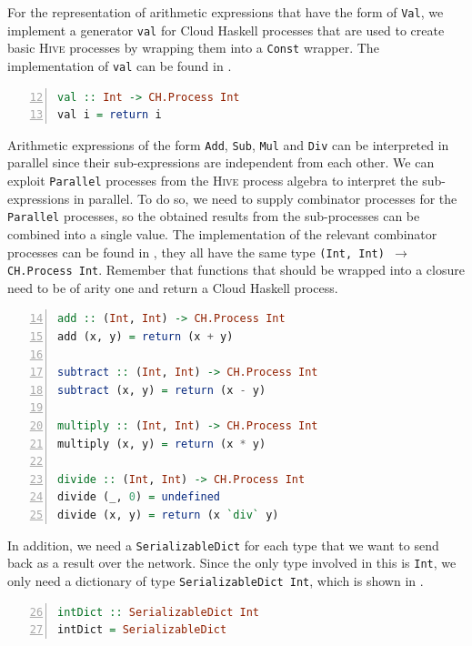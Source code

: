 For the representation of arithmetic expressions that have the form of \texttt{Val}, we implement a generator \texttt{val} for \textsf{Cloud Haskell} processes that are used to create basic \textsc{Hive} processes by wrapping them into a \texttt{Const} wrapper. The implementation of \texttt{val} can be found in .
\begin{lstlisting}[language=Haskell, caption=A generator for \textsf{Cloud Haskell} process for the representation of \texttt{Val} nodes., label=lst:arith_val, numbers=left, frame=bt, firstnumber=12]
val :: Int -> CH.Process Int
val i = return i
\end{lstlisting}

Arithmetic expressions of the form \texttt{Add}, \texttt{Sub}, \texttt{Mul} and \texttt{Div} can be interpreted in parallel since their sub-expressions are independent from each other. We can exploit \texttt{Parallel} processes from the \textsc{Hive} process algebra to interpret the sub-expressions in parallel. To do so, we need to supply combinator processes for the \texttt{Parallel} processes, so the obtained results from the sub-processes can be combined into a single value. The implementation of the relevant combinator processes can be found in , they all have the same type \texttt{(Int, Int) $\to$ CH.Process Int}. Remember that functions that should be wrapped into a closure need to be of arity one and return a \textsf{Cloud Haskell} process.
\begin{lstlisting}[language=Haskell, caption=\textsf{Cloud Haskell} processes for the combination of results from processes that have been executed in parallel., label=lst:arith_combinators,numbers=left, frame=bt, firstnumber=14]
add :: (Int, Int) -> CH.Process Int
add (x, y) = return (x + y)

subtract :: (Int, Int) -> CH.Process Int
subtract (x, y) = return (x - y)

multiply :: (Int, Int) -> CH.Process Int
multiply (x, y) = return (x * y)

divide :: (Int, Int) -> CH.Process Int
divide (_, 0) = undefined
divide (x, y) = return (x `div` y)
\end{lstlisting}

In addition, we need a \texttt{SerializableDict} for each type that we want to send back as a result over the network. Since the only type involved in this is \texttt{Int}, we only need a dictionary of type \texttt{SerializableDict Int}, which is shown in .
\begin{lstlisting}[language=Haskell, caption=\texttt{SerializableDict} for values of type \texttt{Int}., label=lst:arith_dict, numbers=left, frame=bt, firstnumber=26]
intDict :: SerializableDict Int
intDict = SerializableDict
\end{lstlisting}

